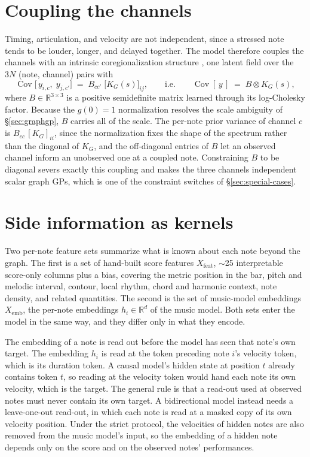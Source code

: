 \documentclass[11pt,a4paper]{report}
\newcommand{\R}{\mathbb{R}}
\begin{document}
\section{Coupling the channels}\label{sec:coreg}
Timing, articulation, and velocity are not independent, since a stressed
note tends to be louder, longer, and delayed together. The model therefore
couples the channels with an intrinsic coregionalization structure
\cite{bonilla2008}, one latent field over the $3N$ (note, channel) pairs with
\begin{equation}
  \operatorname{Cov}\bigl[\, y_{i,c},\; y_{j,c'} \bigr]
  \;=\; B_{cc'}\; \bigl[K_G(s)\bigr]_{ij},
  \qquad \text{i.e.} \qquad
  \operatorname{Cov}[\, y \,] \;=\; B \otimes K_G(s),
  \label{eq:icm}
\end{equation}
where $B \in \R^{3 \times 3}$ is a positive semidefinite matrix learned
through its log-Cholesky factor. Because the $g(0) = 1$ normalization
resolves the scale ambiguity of \S\ref{sec:graphgp}, $B$ carries all of the
scale. The per-note prior variance of channel $c$ is $B_{cc}\,[K_G]_{ii}$,
since the normalization fixes the shape of the spectrum rather than the
diagonal of $K_G$, and the off-diagonal entries of $B$ let an observed
channel inform an unobserved one at a coupled note. Constraining $B$ to be
diagonal severs exactly this coupling and makes the three channels
independent scalar graph GPs, which is one of the constraint switches of
\S\ref{sec:special-cases}.

\section{Side information as kernels}\label{sec:features}
Two per-note feature sets summarize what is known about each note beyond the
graph. The first is a set of hand-built score features $X_{\mathrm{feat}}$,
$\sim$25 interpretable score-only columns plus a bias, covering the metric
position in the bar, pitch and melodic interval, contour, local rhythm,
chord and harmonic context, note density, and related quantities. The second
is the set of music-model embeddings $X_{\mathrm{emb}}$, the per-note
embeddings $h_i \in \R^{d}$ of the music model. Both sets enter the model in
the same way, and they differ only in what they encode.

The embedding of a note is read out before the model has seen that note's
own target. The embedding $h_i$ is read at the token preceding note $i$'s
velocity token, which is its duration token. A causal model's hidden state
at position $t$ already contains token $t$, so reading at the velocity token
would hand each note its own velocity, which is the target. The general rule
is that a read-out used at observed notes must never contain its own target.
A bidirectional model instead needs a leave-one-out read-out, in which each
note is read at a masked copy of its own velocity position. Under the strict
protocol, the velocities of hidden notes are also removed from the music
model's input, so the embedding of a hidden note depends only on the score
and on the observed notes' performances.
\end{document}
